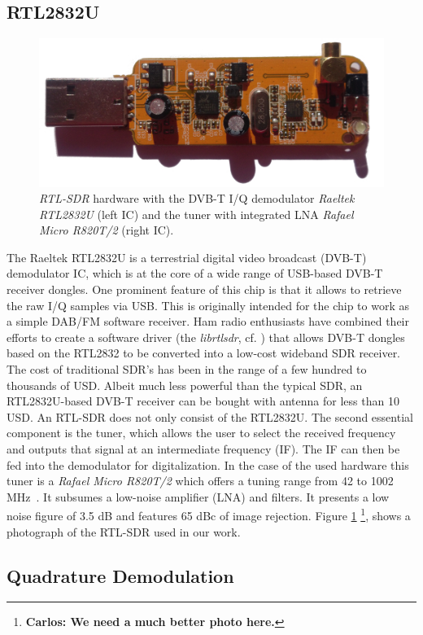 \documentclass[conference]{IEEEtran}
\newcommand{\cp}[1]{\footnote{{\bf Carlos: #1}}}
\begin{document}
\subsection{RTL2832U}
\label{sub:rtl2832}
\begin{figure}[h]
\centering
\includegraphics[width=0.5\columnwidth]{./fig/rtlsdr.jpg}
				\caption{\textit{RTL-SDR} hardware with the DVB-T I/Q demodulator \textit{Raeltek RTL2832U} (left IC) and the tuner with integrated LNA \textit{Rafael Micro R820T/2} (right IC).}
\label{fig:receiver_arch}
\end{figure}
The Raeltek RTL2832U is a terrestrial digital video broadcast (DVB-T) demodulator IC, which is at the core of a wide range of USB-based DVB-T receiver dongles. One prominent feature of this chip is that it allows to retrieve the raw I/Q samples via USB. This is originally intended for the chip to work as a simple DAB/FM software receiver. Ham radio enthusiasts have combined their efforts to create a software driver (the \textit{librtlsdr}, cf. \cite{steve-m_librtlsdr}) that allows DVB-T dongles based on the RTL2832 to be converted into a low-cost wideband SDR receiver. The cost of traditional SDR's has been in the range of a few hundred to thousands of USD. Albeit much less powerful than the typical SDR, an RTL2832U-based DVB-T receiver can be bought with antenna for less than 10 USD.
An RTL-SDR does not only consist of the RTL2832U. The second essential component is the tuner, which allows the user to select the received frequency and outputs that signal at an intermediate frequency (IF). The IF can then be fed into the demodulator for digitalization. In the case of the used hardware this tuner is a \textit{Rafael Micro R820T/2} which offers a tuning range from 42 to 1002 MHz~\cite{rafael_r820t_2011}. It subsumes a low-noise amplifier (LNA) and filters. It presents a low noise figure of 3.5 dB and features 65 dBc of image rejection. Figure \ref{fig:receiver_arch} \cp{We need a much better photo here.}, shows a photograph of the RTL-SDR used in our work. 

\subsection{Quadrature Demodulation}
\end{document}
